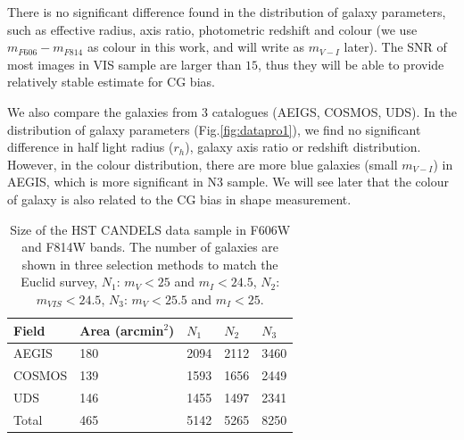 \documentclass[useAMS,usenatbib]{mn2e}
\begin{document}
There is no significant difference found in the distribution of galaxy
parameters, such as effective radius, axis ratio, photometric redshift
and colour (we use $m_{F606}-m_{F814}$ as colour in this work, and
will write as $m_{V-I}$ later). The SNR of most images in VIS sample
are larger than $15$, thus they will be able to provide relatively
stable estimate for CG bias.

We also compare the galaxies from 3 catalogues (AEIGS, COSMOS, UDS).  In
the distribution of galaxy parameters (Fig.\ref{fig:datapro1}), we
find no significant difference in half light radius ($r_h$), galaxy
axis ratio or redshift distribution. However, in the colour
distribution, there are more blue galaxies (small $m_{V-I}$) in AEGIS,
which is more significant in N3 sample. We will see later that the
colour of galaxy is also related to the CG bias in shape measurement.
%
\begin{center}
\begin{table}
  \begin{tabular}{lllll}
    \hline
    Field   &Area (arcmin$^2$) &$N_1$ &$N_2$ &$N_3$\\
    \hline
    AEGIS   &180   &2094  &2112  &3460\\
    COSMOS  &139   &1593  &1656  &2449\\
    UDS     &146   &1455  &1497  &2341\\
    Total   &465   &5142  &5265  &8250\\
    \hline
  \end{tabular}
  \caption{\label{table:mag} Size of the HST CANDELS data sample in F606W
    and F814W bands.  The number of galaxies are shown in three selection
    methods to match the Euclid survey, $N_1$: $m_V<25$ and $m_I<24.5$,
    $N_2$: $m_{VIS}<24.5$, $N_3$: $m_V<25.5$ and $m_I<25$. }
\end{table}
\end{center}
%
\end{document}
